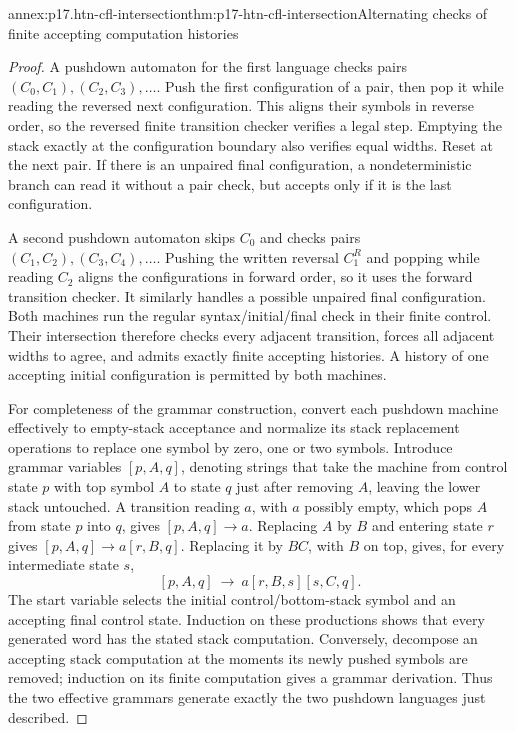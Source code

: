 \begin{annexitem}{annex:p17.htn-cfl-intersection}{thm:p17-htn-cfl-intersection}{Alternating checks of finite accepting computation histories}
\begin{proof}
A pushdown automaton for the first language checks pairs
\((C_0,C_1),(C_2,C_3),\ldots\). Push the first configuration of a pair,
then pop it while reading the reversed next configuration. This aligns
their symbols in reverse order, so the reversed finite transition checker
verifies a legal step. Emptying the stack exactly at the configuration
boundary also verifies equal widths. Reset at the next pair. If there is
an unpaired final configuration, a nondeterministic branch can read it
without a pair check, but accepts only if it is the last configuration.

A second pushdown automaton skips \(C_0\) and checks pairs
\((C_1,C_2),(C_3,C_4),\ldots\). Pushing the written reversal \(C_1^R\)
and popping while reading \(C_2\) aligns the configurations in forward
order, so it uses the forward transition checker. It similarly handles
a possible unpaired final configuration. Both machines run the regular
syntax/initial/final check in their finite control. Their intersection
therefore checks every adjacent transition, forces all adjacent widths
to agree, and admits exactly finite accepting histories. A history of
one accepting initial configuration is permitted by both machines.

For completeness of the grammar construction, convert each pushdown
machine effectively to empty-stack acceptance and normalize its stack
replacement operations to replace one symbol by zero, one or two symbols.
Introduce grammar variables \([p,A,q]\), denoting strings that take the
machine from control state \(p\) with top symbol \(A\) to state \(q\)
just after removing \(A\), leaving the lower stack untouched. A transition
reading \(a\), with \(a\) possibly empty, which pops \(A\) from state
\(p\) into \(q\), gives \([p,A,q]\to a\). Replacing \(A\) by
\(B\) and entering state \(r\) gives
\([p,A,q]\to a[r,B,q]\). Replacing it by \(BC\), with \(B\) on top,
gives, for every intermediate state \(s\),
\[
 [p,A,q]\ \to\ a[r,B,s][s,C,q].
\]
The start variable selects the initial control/bottom-stack symbol and
an accepting final control state. Induction on these productions shows
that every generated word has the stated stack computation. Conversely,
decompose an accepting stack computation at the moments its newly pushed
symbols are removed; induction on its finite computation gives a grammar
derivation. Thus the two effective grammars generate exactly the two
pushdown languages just described.


\end{proof}
\end{annexitem}
